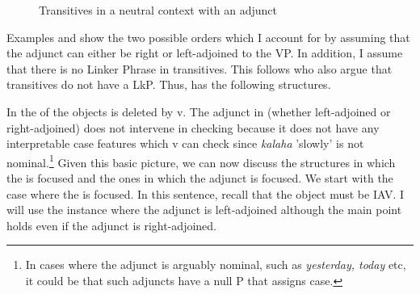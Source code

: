 \documentclass[output=paper,newtxmath,modfonts,nonflat,hidelinks]{langsci/langscibook}
\begin{document}
\begin{figure}
%
	\caption{\label{fig:selvanathan:5}Transitives in a neutral context with an adjunct}
\end{figure}

   
 Examples  and  show the two possible orders which I account for by assuming that the  adjunct can either be right or left-adjoined to the VP. In addition, I assume that there is no Linker Phrase in transitives. This follows \citet{Baker2006} who also argue that  transitives do not have a LkP. Thus,   has the following structures.

In  the  of the objects is deleted by v. The adjunct in  (whether left-adjoined or right-adjoined) does not intervene in  checking because it does not have any interpretable case features which v can check since \textit{kalaha} 'slowly' is not nominal.\footnote{In cases where the adjunct is arguably nominal, such as \textit{yesterday, today} etc, it could be that such adjuncts have a null P that assigns case.}  Given this basic picture, we can now discuss the structures in which the  is focused and the ones in which the adjunct is focused. We start with the case where the  is focused. In this sentence, recall that the object must be IAV. I will use the instance where the adjunct is left-adjoined although the main point holds even if the adjunct is right-adjoined.
\end{document}
